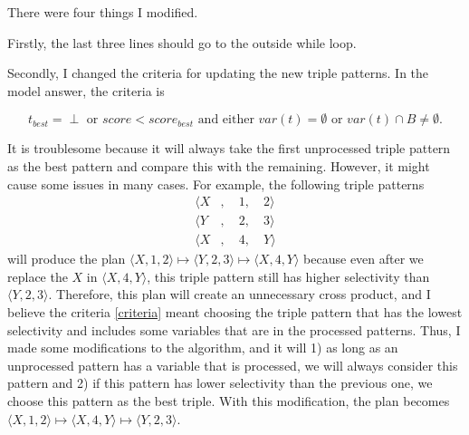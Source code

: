 \documentclass{article}
\begin{document}
\begin{enumerate}
\begin{enumerate}
There were four things I modified. 

Firstly, the last three lines should go to the outside while loop. 


Secondly, I changed the criteria for updating the new triple patterns. In the model answer, the criteria is 

\begin{equation}\label{criteria}
	t_{best} = \perp \text{ or } score < score_{best} \text{ and either } var(t) = \emptyset \text{ or } var(t) \cap B \neq \emptyset.
\end{equation}

It is troublesome because it will always take the first unprocessed triple pattern as the best pattern and compare this with the remaining. However, it might cause some issues in many cases. For example, the following triple patterns 
\begin{align*}
	\langle X &,\quad 1,\quad 2\rangle \\
	\langle Y &,\quad 2,\quad 3\rangle\\
	\langle X &,\quad 4,\quad Y\rangle
\end{align*}
will produce the plan $\langle X, 1, 2\rangle \mapsto \langle Y, 2, 3\rangle \mapsto \langle X, 4, Y\rangle$ because even after we replace the $X$ in $\langle X, 4, Y\rangle$, this triple pattern still has higher selectivity than $\langle Y, 2, 3\rangle$. Therefore, this plan will create an unnecessary cross product, and I believe the criteria \eqref{criteria} meant choosing the triple pattern that has the lowest selectivity and includes some variables that are in the processed patterns. Thus, I made some modifications to the algorithm, and it will 1) as long as an unprocessed pattern has a variable that is processed, we will always consider this pattern and 2) if this pattern has lower selectivity than the previous one, we choose this pattern as the best triple. With this modification, the plan becomes $\langle X, 1, 2\rangle \mapsto \langle X, 4, Y\rangle \mapsto \langle Y, 2, 3\rangle$. 


\end{enumerate}
\end{enumerate}
\end{document}
